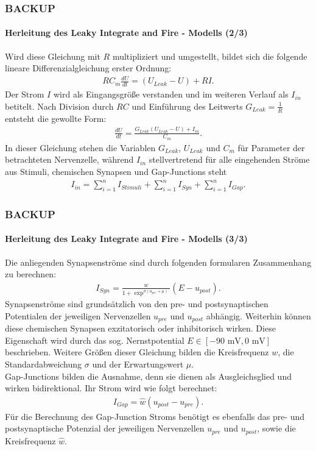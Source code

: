 \documentclass[10pt,t,aspectratio=1610]{beamer}
\newcommand{\ChapterBackup}{BACKUP}
\begin{document}
\begin{frame}
	\frametitle{\ChapterBackup}
	\framesubtitle{Herleitung des Leaky Integrate and Fire - Modells (2/3)}
	\vspace{0.3cm}
	Wird diese Gleichung mit $R$ multipliziert und umgestellt, bildet sich die folgende lineare Differenzialgleichung erster Ordnung:
	\begin{align}
	\label{eq:lif_nd}
	R C_m \frac{dU}{dt} = (U_{Leak} - U) + R I\text{.}
	\end{align}
	Der Strom $I$ wird als Eingangsgröße verstanden und im weiteren Verlauf als $I_{in}$ betitelt. Nach Division durch $RC$ und Einführung des Leitwerts $G_{Leak} = \tfrac{1}{R}$ entsteht die gewollte Form:
	\begin{align}
	\label{eq:lif}
	\frac{dU}{dt} = \frac{G_{Leak}(U_{Leak} - U) + I_{in}}{C_m}\text{.}
	\end{align}
	In dieser Gleichung stehen die Variablen $G_{Leak}$, $U_{Leak}$ und $C_m$ für Parameter der betrachteten Nervenzelle, während $I_{in}$ stellvertretend für alle eingehenden Ströme aus Stimuli, chemischen Synapsen und Gap-Junctions steht
	\begin{align}
	\label{eq:lif_current_in}
	I_{in} = \sum_{i = 1}^{n}{I_{Stimuli}} + \sum_{i = 1}^{n}{I_{Syn}} + \sum_{i = 1}^{n}{I_{Gap}}\text{.}
	\end{align}
\end{frame}


\begin{frame}
	\frametitle{\ChapterBackup}
	\framesubtitle{Herleitung des Leaky Integrate and Fire - Modells (3/3)}
	\vspace{0.3cm}
	Die anliegenden Synapsenströme sind durch folgenden formularen Zusammenhang zu berechnen:
	\begin{align}
	\label{eq:chem_syn_current}
	I_{Syn} = \frac{w}{1 + \exp^{\sigma(u_{pre} + \mu)}}(E - u_{post})\text{.}
	\end{align}
	Synapsenströme sind grundsätzlich von den pre- und postsynaptischen Potentialen der jeweiligen Nervenzellen $u_{pre}$ und $u_{post}$ abhängig. Weiterhin können diese chemischen Synapsen exzitatorisch oder inhibitorisch wirken. Diese Eigenschaft wird durch das sog. Nernstpotential $E\in[-90\text{ mV}, 0\text{ mV}]$ beschrieben. Weitere Größen dieser Gleichung bilden die Kreisfrequenz $w$, die Standardabweichung $\sigma$ und der Erwartungswert $\mu$.\\
	Gap-Junctions bilden die Ausnahme, denn sie dienen als Ausgleichsglied und wirken bidirektional. Ihr Strom wird wie folgt berechnet:
	\begin{align}
	\label{eq:gap_syn_current}
	I_{Gap} = \hat{w}(u_{post} - u_{pre})\text{.}
	\end{align}
	Für die Berechnung des Gap-Junction Stroms benötigt es ebenfalls das pre- und postsynaptische Potenzial der jeweiligen Nervenzellen $u_{pre}$ und $u_{post}$, sowie die Kreisfrequenz $\hat{w}$.
\end{frame}
\end{document}
